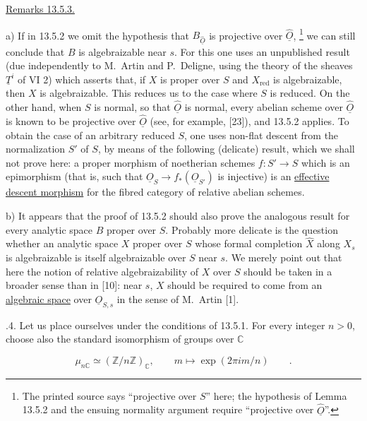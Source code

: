 \medskip
\noindent
\underline{Remarks 13.5.3.}

\smallskip
\noindent
a) If in 13.5.2 we omit the hypothesis that
$B_{\hat{\underline O}}$ is projective over $\hat{\underline O}$,
\footnote{The printed source says ``projective over $S$'' here; the
hypothesis of Lemma 13.5.2 and the ensuing normality argument require
``projective over $\hat{\underline O}$''.}
we can still conclude that $B$ is algebraizable near $s$.  For this one
uses an unpublished result (due independently to M.~Artin and
P.~Deligne, using the theory of the sheaves $\underline T^i$ of VI 2)
which asserts that, if $X$ is proper over $S$ and $X_{\mathrm{red}}$ is
algebraizable, then $X$ is algebraizable.  This reduces us to the case
where $S$ is reduced.  On the other hand, when $S$ is normal, so that
$\hat{\underline O}$ is normal, every abelian scheme over
$\hat{\underline O}$ is known to be projective over
$\hat{\underline O}$ (see, for example, [23]), and 13.5.2 applies.  To
obtain the case of an arbitrary reduced $S$, one uses non-flat descent
from the normalization $S'$ of $S$, by means of the following
(delicate) result, which we shall not prove here: a proper morphism of
noetherian schemes $f:S'\longrightarrow S$ which is an epimorphism
(that is, such that
$\underline O_S\longrightarrow f_*(\underline O_{S'})$ is injective)
is an \underline{effective descent morphism} for the fibred category of
relative abelian schemes.

\smallskip
\noindent
b) It appears that the proof of 13.5.2 should also prove the analogous
result for every analytic space $B$ proper over $S$.  Probably more
delicate is the question whether an analytic space $X$ proper over $S$
whose formal completion $\hat X$ along $X_s$ is algebraizable is itself
algebraizable over $S$ near $s$.  We merely point out that here the
notion of relative algebraizability of $X$ over $S$ should be taken in
a broader sense than in [10]: near $s$, $X$ should be required to come
from an \underline{algebraic space} over $\underline O_{S,s}$ in the
sense of M.~Artin [1].

\medskip
{}.4. Let us place ourselves under the conditions of 13.5.1.  For
every integer $n>0$, choose also the standard isomorphism of groups over
$\mathbb C$

\begin{equation*}
 \mu_{n\mathbb C}\simeq(\mathbb Z/n\mathbb Z)_{\mathbb C},
 \qquad m\longmapsto\exp(2\pi i m/n)\qquad .
\end{equation*}

